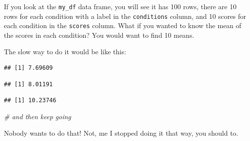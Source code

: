 \documentclass[
]{book}
\newenvironment{Shaded}{\begin{snugshade}}{\end{snugshade}}
\newcommand{\CommentTok}[1]{\textcolor[rgb]{0.56,0.35,0.01}{\textit{#1}}}
\newcommand{\FunctionTok}[1]{\textcolor[rgb]{0.00,0.00,0.00}{#1}}
\newcommand{\NormalTok}[1]{#1}
\newcommand{\SpecialCharTok}[1]{\textcolor[rgb]{0.00,0.00,0.00}{#1}}
\newcommand{\StringTok}[1]{\textcolor[rgb]{0.31,0.60,0.02}{#1}}
\begin{document}
If you look at the \texttt{my\_df} data frame, you will see it has 100 rows, there are 10 rows for each condition with a label in the \texttt{conditions} column, and 10 scores for each condition in the \texttt{scores} column. What if you wanted to know the mean of the scores in each condition? You would want to find 10 means.

The slow way to do it would be like this:

\begin{Shaded}
\end{Shaded}

\begin{verbatim}
## [1] 7.69609
\end{verbatim}

\begin{Shaded}
\end{Shaded}

\begin{verbatim}
## [1] 8.01191
\end{verbatim}

\begin{Shaded}
\end{Shaded}

\begin{verbatim}
## [1] 10.23746
\end{verbatim}

\begin{Shaded}
\begin{Highlighting}[]
\CommentTok{\# and then keep going}
\end{Highlighting}
\end{Shaded}

Nobody wants to do that! Not, me I stopped doing it that way, you should to.
\end{document}
